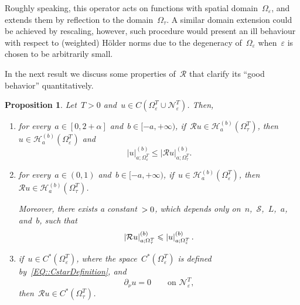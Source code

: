 \documentclass[12pt,a4paper]{amsart}
\makeatletter
\numberwithin{equation}{section}
\newtheorem{proposition}[theorem]{Proposition}
\theoremstyle{definition}
\theoremstyle{remark}
\newcommand{\eps}{\varepsilon}
\newcommand{\abs}[1]{\left\lvert#1\right\rvert}
\renewcommand{\leq}{\leqslant}
\newcommand{\const}[1]{%
  \csname const@#1\endcsname%
}
\makeatother
\begin{document}
Roughly speaking, this operator acts on functions with spatial domain~$\Omega_\eps$, and extends them by reflection to the domain~$\Omega_\tau$. A similar domain extension could be achieved by rescaling, however, such procedure would present an ill behaviour with respect to (weighted) Hölder norms due to the degeneracy of~$\Omega_\eps$ when~$\eps$ is chosen to be arbitrarily small.

In the next result we discuss some properties of~$\mathcal{R}$ that clarify its ``good behavior'' quantitatively.

\begin{proposition}\label{PROP::RTopologicalIsomorphism}
    Let~$T > 0$ and~$u \in C\left(\Omega_\eps^T \cup \mathcal{N}_\eps^T\right)$. Then,
    \begin{enumerate}[label= (\roman*)]
        \item\label{ITM::RuHolderImpliesuHolder} for every~$a \in [0,2+\alpha]$ and~$b \in [-a,+\infty)$, if~$\mathcal{R}u \in \mathcal{H}_a^{(b)}(\Omega_\tau^T)$, then~$u \in \mathcal{H}_a^{(b)}(\Omega_\eps^T)$ and %
            \begin{equation}
                \abs{u}_{a; \Omega_\eps^T}^{(b)} \leq \abs{\mathcal{R}u}_{a; \Omega_\tau^T}^{(b)}.
            \end{equation}
        \item\label{ITM::uHolderImpliesRuHolder} for every~$a \in (0,1)$ and~$b \in [-a,+\infty)$, if~$u \in \mathcal{H}_a^{(b)}(\Omega_\eps^T)$, then~$\mathcal{R}u \in \mathcal{H}_a^{(b)}(\Omega_\tau^T)$. %
            
            Moreover, there exists a constant~$\const{CONST::RuHolderEstimate} > 0$, which depends only on~$n$,~$\mathcal{S}$,~$L$,~$a$, and~$b$, such that
            \begin{equation}\label{EQ::RuHolderEstimate}
                \abs{\mathcal{R}u}_{a; \Omega_\tau^T}^{(b)} \leq \const{CONST::RuHolderEstimate} \abs{u}_{a; \Omega_\eps^T}^{(b)}.
            \end{equation}
        \item\label{ITM::uCastImpliesRuCast} if~$u \in C^\ast(\Omega_\eps^T)$, where the space~$C^\ast(\Omega_\eps^T)$ is defined by~\eqref{EQ::CstarDefinition}, and %
            \begin{equation}\label{EQ::NeumannAssumptionRuProperties}
                \partial_\nu u = 0 \qquad \text{on }\mathcal{N}_\eps^T,
            \end{equation}
            then~$\mathcal{R}u \in C^\ast(\Omega_\tau^T)$.
    \end{enumerate}
\end{proposition}
\end{document}
